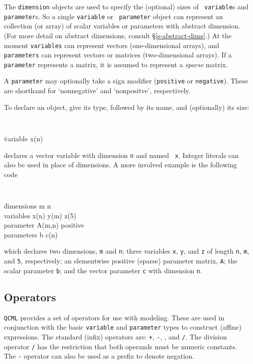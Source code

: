 \documentclass[11pt]{article}
\def\qcml{\texttt{QCML}\xspace}
\begin{document}
The {\tt dimension} objects are used to specify the (optional) sizes of {\tt
variable}s and {\tt parameter}s. So a single {\tt variable} or {\tt
parameter} object can represent an collection (or array) of scalar variables
or parameters with abstract dimension. (For more detail on abstract
dimensions, consult \S\ref{s-abstract-dims}.) At the moment {\tt variables}
can represent vectors (one-dimensional arrays), and {\tt parameters} can
represent vectors or matrices (two-dimensional arrays). If a {\tt parameter}
represents a matrix, it is assumed to represent a \emph{sparse} matrix.

A {\tt parameter} may optionally take a sign modifier ({\tt positive} or 
{\tt negative}). These are shorthand for `nonnegative' and `nonpositve', 
respectively.

To declare an object, give its type, followed by its name, and (optionally) 
its size:
{\tt
\begin{tabbing}
  \qquad \= variable x(n)
\end{tabbing}}
\noindent declares a vector variable with dimension {\tt n} and named {\tt
x}. Integer literals can also be used in place of dimensions. A more involved
example is the following code
{\tt
\begin{tabbing}
  \qquad \= dimensions m n \\
  \> variables x(n) y(m) z(5)\\
  \> parameter A(m,n) positive \\
  \> parameters b c(n)
\end{tabbing}}
\noindent which declares two dimensions, {\tt m} and {\tt n}; three variables
{\tt x}, {\tt y}, and {\tt z} of length {\tt n}, {\tt m}, and {\tt 5},
respectively; an elementwise positive (sparse) parameter matrix, {\tt A}; the
scalar parameter {\tt b}; and the vector parameter {\tt c} with dimension
{\tt n}.

\subsection{Operators}
\qcml provides a set of operators for use with modeling. These are used in
conjunction with the basic {\tt variable} and {\tt parameter} types to
construct (affine) expressions. The standard (infix) operators are: {\tt +},
{\tt -}, {\tt *}, and {\tt /}. The division operator {\tt /} has the
restriction that both operands must be numeric constants. The {\tt -}
operator can also be used as a prefix to denote negation.
\end{document}
